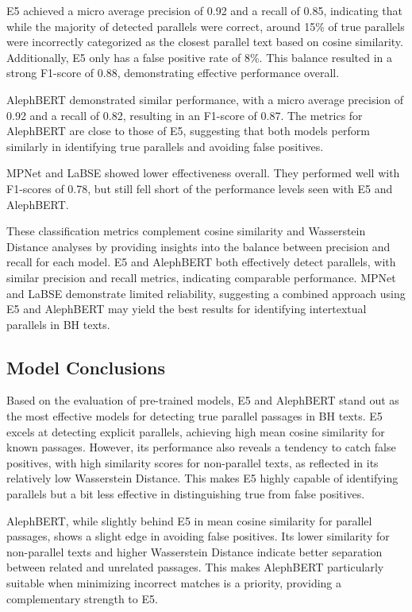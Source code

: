 \documentclass[12pt]{article}
\begin{document}
E5 achieved a micro average precision of 0.92 and a recall of 0.85, indicating that while the majority of detected parallels were correct, around 15\% of true parallels were incorrectly categorized as the closest parallel text based on cosine similarity. Additionally, E5 only has a false positive rate of 8\%. This balance resulted in a strong F1-score of 0.88, demonstrating effective performance overall.

AlephBERT demonstrated similar performance, with a micro average precision of 0.92 and a recall of 0.82, resulting in an F1-score of 0.87. The metrics for AlephBERT are close to those of E5, suggesting that both models perform similarly in identifying true parallels and avoiding false positives.

MPNet and LaBSE showed lower effectiveness overall. They performed well with F1-scores of 0.78, but still fell short of the performance levels seen with E5 and AlephBERT.

These classification metrics complement cosine similarity and Wasserstein Distance analyses by providing insights into the balance between precision and recall for each model. E5 and AlephBERT both effectively detect parallels, with similar precision and recall metrics, indicating comparable performance. MPNet and LaBSE demonstrate limited reliability, suggesting a combined approach using E5 and AlephBERT may yield the best results for identifying intertextual parallels in BH texts.

\subsection{Model Conclusions}
Based on the evaluation of pre-trained models, E5 and AlephBERT stand out as the most effective models for detecting true parallel passages in BH texts. E5 excels at detecting explicit parallels, achieving high mean cosine similarity for known passages. However, its performance also reveals a tendency to catch false positives, with high similarity scores for non-parallel texts, as reflected in its relatively low Wasserstein Distance. This makes E5 highly capable of identifying parallels but a bit less effective in distinguishing true from false positives.

AlephBERT, while slightly behind E5 in mean cosine similarity for parallel passages, shows a slight edge in avoiding false positives. Its lower similarity for non-parallel texts and higher Wasserstein Distance indicate better separation between related and unrelated passages. This makes AlephBERT particularly suitable when minimizing incorrect matches is a priority, providing a complementary strength to E5.
\end{document}
